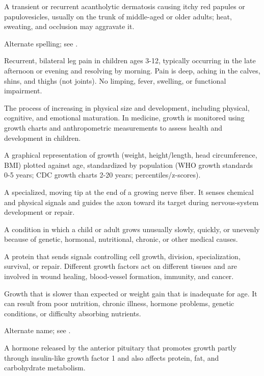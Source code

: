  A transient or recurrent acantholytic dermatosis causing itchy red papules or papulovesicles, usually on the trunk of middle-aged or older adults; heat, sweating, and occlusion may aggravate it.

 Alternate spelling; see .

 Recurrent, bilateral leg pain in children ages 3-12, typically occurring in the late
afternoon or evening and resolving by morning. Pain is deep, aching in the calves,
shins, and thighs (not joints). No limping, fever, swelling, or functional impairment.

 The process of increasing in physical size and development, including physical, cognitive, and emotional maturation. In medicine, growth is monitored using growth charts and anthropometric measurements to assess health and development in children.

 A graphical representation of growth (weight, height/length, head circumference, BMI)
plotted against age, standardized by population (WHO growth standards 0-5 years; CDC
growth charts 2-20 years; percentiles/z-scores).

 A specialized, moving tip at the end of a growing nerve fiber. It senses chemical and physical signals and guides the axon toward its target during nervous-system development or repair.

 A condition in which a child or adult grows unusually slowly, quickly, or unevenly because of genetic, hormonal, nutritional, chronic, or other medical causes.

 A protein that sends signals controlling cell growth, division, specialization, survival, or repair. Different growth factors act on different tissues and are involved in wound healing, blood-vessel formation, immunity, and cancer.

 Growth that is slower than expected or weight gain that is inadequate for age. It can result from poor nutrition, chronic illness, hormone problems, genetic conditions, or difficulty absorbing nutrients.

 Alternate name; see .

 A hormone released by the anterior pituitary that promotes growth partly through insulin-like growth factor 1 and also affects protein, fat, and carbohydrate metabolism.

